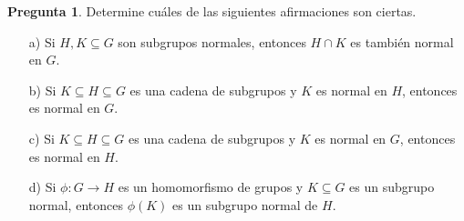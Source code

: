 \documentclass{article}
\theoremstyle{definition}
\newtheorem{pregunta}{Pregunta}
\begin{document}
\begin{pregunta}
  Determine cuáles de las siguientes afirmaciones son ciertas.

  \begin{enumerate}
  \item[a)] Si $H,K \subseteq G$ son subgrupos normales, entonces $H\cap K$ es
    también normal en $G$.

  \item[b)] Si $K \subseteq H \subseteq G$ es una cadena de subgrupos y $K$ es
    normal en $H$, entonces es normal en $G$.

  \item[c)] Si $K \subseteq H \subseteq G$ es una cadena de subgrupos y $K$ es
    normal en $G$, entonces es normal en $H$.

  \item[d)] Si $\phi\colon G\to H$ es un homomorfismo de grupos y
    $K \subseteq G$ es un subgrupo normal, entonces $\phi (K)$ es un subgrupo
    normal de $H$.
  \end{enumerate}
\end{pregunta}
\end{document}

